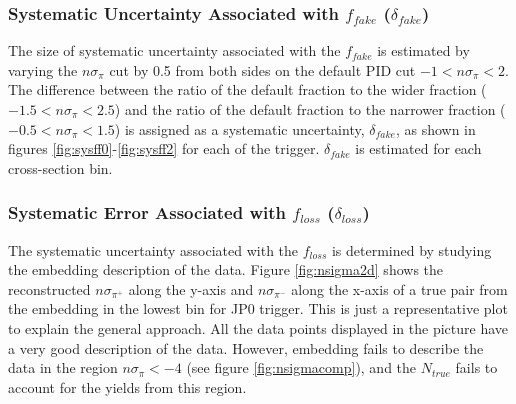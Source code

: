 

\subsubsection{Systematic Uncertainty Associated with $f_{fake}$ ($\delta_{fake}$) }
The size of systematic uncertainty associated with the $f_{fake}$ is estimated by varying the $n\sigma_\pi$ cut by 0.5 from both sides on the default PID cut $-1<n\sigma_\pi<2$. The difference between the ratio of the default fraction to the wider fraction ($-1.5<n\sigma_\pi<2.5$) and the ratio of the default fraction to the narrower fraction ($-0.5<n\sigma_\pi<1.5$) is assigned as a systematic uncertainty, $\delta_{fake}$, as shown in figures \ref{fig:sysff0}-\ref{fig:sysff2} for each of the trigger.  $\delta_{fake}$ is estimated for each cross-section bin.     




\subsubsection{Systematic Error Associated with $f_{loss}$ ($\delta_{loss}$)}
The systematic uncertainty associated with the $f_{loss}$ is determined by studying the embedding description of the data. Figure \ref{fig:nsigma2d} shows the reconstructed $n\sigma_{\pi^+}$ along the y-axis and $n\sigma_{\pi^-}$ along the x-axis of a true \dipion pair from the embedding in the lowest \mpair bin for JP0 trigger. This is just a representative plot to explain the general approach. All the data points displayed in the picture have a very good description of the data. However, embedding fails to describe the data in the region $ n\sigma_\pi <-4$ (see figure \ref{fig:nsigmacomp}), and the $N_{true}$ fails to account for the \dipion yields from this region.

